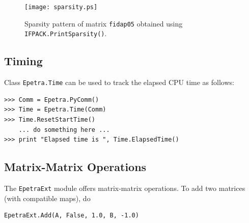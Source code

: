 \documentclass[10pt,relax]{SANDreport}
\begin{document}
\begin{figure}
\begin{center}
\texttt{[image: sparsity.ps]}
\caption{Sparsity pattern of matrix {\tt fidap05} obtained using {\tt
  IFPACK.PrintSparsity()}.}
\label{fig:sparsity}
\end{center}
\end{figure}

\subsection{Timing}

Class {\tt Epetra.Time} can be used to track the elapsed CPU time as follows:
\begin{verbatim}
>>> Comm = Epetra.PyComm()
>>> Time = Epetra.Time(Comm)
>>> Time.ResetStartTime()
    ... do something here ...
>>> print "Elapsed time is ", Time.ElapsedTime()
\end{verbatim}

\subsection{Matrix-Matrix Operations}

The {\tt EpetraExt} module offers matrix-matrix operations. To add two matrices
(with compatible maps), do
\begin{verbatim}
EpetraExt.Add(A, False, 1.0, B, -1.0)
\end{verbatim}



\end{document}

